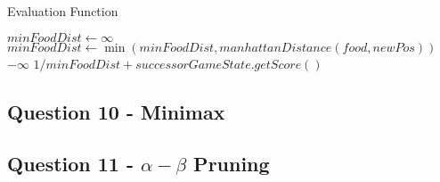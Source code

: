 \begin{algorithm}
\caption{Evaluation Function}
\begin{algorithmic}[1]
    \State $minFoodDist \gets \infty$
        \State $minFoodDist \gets \min(minFoodDist, manhattanDistance(food, newPos))$
    \EndFor
            \Return $-\infty$
        \EndIf
    \EndFor
    \State \Return $1 / minFoodDist + successorGameState.getScore()$
\EndProcedure
\end{algorithmic}
\end{algorithm}
\pagebreak
\subsection{Question 10 - Minimax}
\subsection{Question 11 - $\alpha - \beta$ Pruning}  